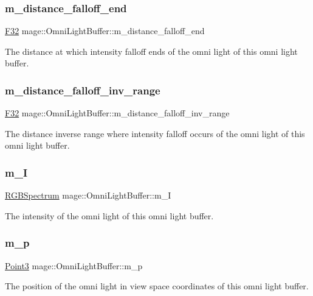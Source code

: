 \subsubsection{\texorpdfstring{m\+\_\+distance\+\_\+falloff\+\_\+end}{m\_distance\_falloff\_end}}
{\footnotesize\ttfamily \hyperlink{namespacemage_aa97e833b45f06d60a0a9c4fc22ae02c0}{F32} mage\+::\+Omni\+Light\+Buffer\+::m\+\_\+distance\+\_\+falloff\+\_\+end}

The distance at which intensity falloff ends of the omni light of this omni light buffer. \hypertarget{structmage_1_1_omni_light_buffer_a4dc8e385dc74c2a731b4c9306765c3d8}{}\label{structmage_1_1_omni_light_buffer_a4dc8e385dc74c2a731b4c9306765c3d8} 
\subsubsection{\texorpdfstring{m\+\_\+distance\+\_\+falloff\+\_\+inv\+\_\+range}{m\_distance\_falloff\_inv\_range}}
{\footnotesize\ttfamily \hyperlink{namespacemage_aa97e833b45f06d60a0a9c4fc22ae02c0}{F32} mage\+::\+Omni\+Light\+Buffer\+::m\+\_\+distance\+\_\+falloff\+\_\+inv\+\_\+range}

The distance inverse range where intensity falloff occurs of the omni light of this omni light buffer. \hypertarget{structmage_1_1_omni_light_buffer_ac3273113ad647103c911bbbf6bb41697}{}\label{structmage_1_1_omni_light_buffer_ac3273113ad647103c911bbbf6bb41697} 
\subsubsection{\texorpdfstring{m\+\_\+I}{m\_I}}
{\footnotesize\ttfamily \hyperlink{structmage_1_1_r_g_b_spectrum}{R\+G\+B\+Spectrum} mage\+::\+Omni\+Light\+Buffer\+::m\+\_\+I}

The intensity of the omni light of this omni light buffer. \hypertarget{structmage_1_1_omni_light_buffer_a777b98a686a7e39bd7b401748629d9fc}{}\label{structmage_1_1_omni_light_buffer_a777b98a686a7e39bd7b401748629d9fc} 
\subsubsection{\texorpdfstring{m\+\_\+p}{m\_p}}
{\footnotesize\ttfamily \hyperlink{structmage_1_1_point3}{Point3} mage\+::\+Omni\+Light\+Buffer\+::m\+\_\+p}

The position of the omni light in view space coordinates of this omni light buffer. 